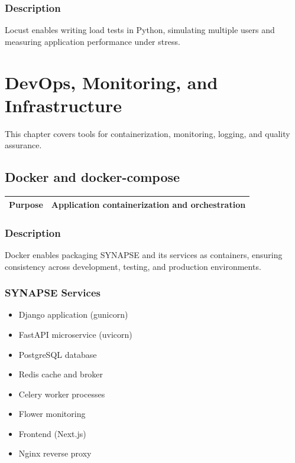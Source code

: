 \documentclass[12pt,a4paper]{report}
\begin{document}
\subsection{Description}

Locust enables writing load tests in Python, simulating multiple users and measuring application performance under stress.

\chapter{DevOps, Monitoring, and Infrastructure}

This chapter covers tools for containerization, monitoring, logging, and quality assurance.

\section{Docker and docker-compose}

\begin{tabular}{|p{4cm}|p{10cm}|}
\hline
\textbf{Purpose} & Application containerization and orchestration \\
\hline
\end{tabular}

\subsection{Description}

Docker enables packaging SYNAPSE and its services as containers, ensuring consistency across development, testing, and production environments.

\subsection{SYNAPSE Services}

\begin{itemize}
    \item Django application (gunicorn)
    \item FastAPI microservice (uvicorn)
    \item PostgreSQL database
    \item Redis cache and broker
    \item Celery worker processes
    \item Flower monitoring
    \item Frontend (Next.js)
    \item Nginx reverse proxy
\end{itemize}
\end{document}
